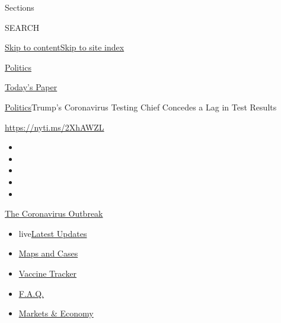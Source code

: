 Sections

SEARCH

\protect\hyperlink{site-content}{Skip to
content}\protect\hyperlink{site-index}{Skip to site index}

\href{https://www.nytimes.com/section/politics}{Politics}

\href{https://myaccount.nytimes.com/auth/login?response_type=cookie\&client_id=vi}{}

\href{https://www.nytimes.com/section/todayspaper}{Today's Paper}

\href{/section/politics}{Politics}\textbar{}Trump's Coronavirus Testing
Chief Concedes a Lag in Test Results

\href{https://nyti.ms/2XhAWZL}{https://nyti.ms/2XhAWZL}

\begin{itemize}
\item
\item
\item
\item
\item
\end{itemize}

\href{https://www.nytimes.com/news-event/coronavirus?action=click\&pgtype=Article\&state=default\&region=TOP_BANNER\&context=storylines_menu}{The
Coronavirus Outbreak}

\begin{itemize}
\tightlist
\item
  live\href{https://www.nytimes.com/2020/08/08/world/coronavirus-updates.html?action=click\&pgtype=Article\&state=default\&region=TOP_BANNER\&context=storylines_menu}{Latest
  Updates}
\item
  \href{https://www.nytimes.com/interactive/2020/us/coronavirus-us-cases.html?action=click\&pgtype=Article\&state=default\&region=TOP_BANNER\&context=storylines_menu}{Maps
  and Cases}
\item
  \href{https://www.nytimes.com/interactive/2020/science/coronavirus-vaccine-tracker.html?action=click\&pgtype=Article\&state=default\&region=TOP_BANNER\&context=storylines_menu}{Vaccine
  Tracker}
\item
  \href{https://www.nytimes.com/interactive/2020/world/coronavirus-tips-advice.html?action=click\&pgtype=Article\&state=default\&region=TOP_BANNER\&context=storylines_menu}{F.A.Q.}
\item
  \href{https://www.nytimes.com/live/2020/08/07/business/stock-market-today-coronavirus?action=click\&pgtype=Article\&state=default\&region=TOP_BANNER\&context=storylines_menu}{Markets
  \& Economy}
\end{itemize}

